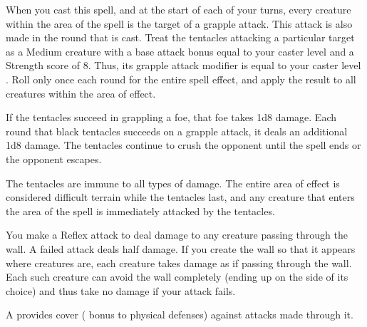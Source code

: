 \spellrng{\rngmed}
\begin{spelleffect}
  When you cast this spell, and at the start of each of your turns, every creature within the area of the spell is the target of a grapple attack. This attack is also made in the round that  is cast. Treat the tentacles attacking a particular target as a Medium creature with a base attack bonus equal to your caster level and a Strength score of 8. Thus, its grapple attack modifier is equal to your caster level . Roll only once each round for the entire spell effect, and apply the result to all creatures within the area of effect.
  \par If the tentacles succeed in grappling a foe, that foe takes 1d8 damage. Each round that black tentacles succeeds on a grapple attack, it deals an additional 1d8 damage. The tentacles continue to crush the opponent until the spell ends or the opponent escapes.
  \par The tentacles are immune to all types of damage. The entire area of effect is considered difficult terrain while the tentacles last, and any creature that enters the area of the spell is immediately attacked by the tentacles.
\end{spelleffect}

\spellrng{\rngmed}
\begin{spelleffect}
  You make a Reflex attack to deal damage to any creature passing through the wall. A failed attack deals half damage. If you create the wall so that it appears where creatures are, each creature takes damage as if passing through the wall. Each such creature can avoid the wall completely (ending up on the side of its choice) and thus take no damage if your attack fails.
  \par A  provides cover ( bonus to physical defenses) against attacks made through it.
\end{spelleffect}

